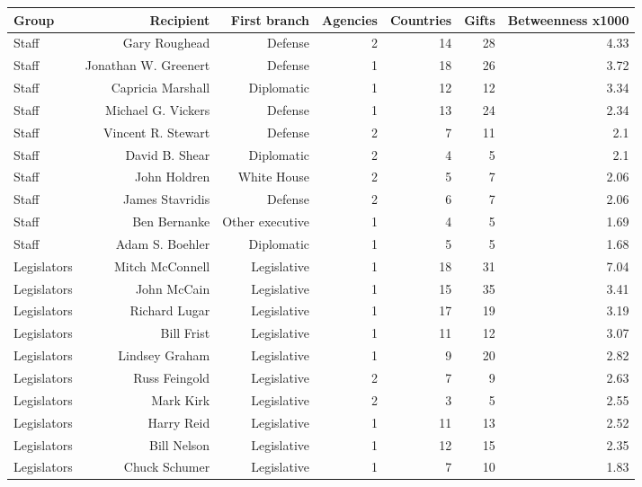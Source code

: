 \begin{tabular}{lrrrrrr}
\toprule
Group & Recipient & First branch & Agencies & Countries & Gifts & Betweenness x1000 \\
\midrule
Staff & Gary Roughead & Defense & 2 & 14 & 28 & 4.33 \\
Staff & Jonathan W. Greenert & Defense & 1 & 18 & 26 & 3.72 \\
Staff & Capricia Marshall & Diplomatic & 1 & 12 & 12 & 3.34 \\
Staff & Michael G. Vickers & Defense & 1 & 13 & 24 & 2.34 \\
Staff & Vincent R. Stewart & Defense & 2 & 7 & 11 & 2.1 \\
Staff & David B. Shear & Diplomatic & 2 & 4 & 5 & 2.1 \\
Staff & John Holdren & White House & 2 & 5 & 7 & 2.06 \\
Staff & James Stavridis & Defense & 2 & 6 & 7 & 2.06 \\
Staff & Ben Bernanke & Other executive & 1 & 4 & 5 & 1.69 \\
Staff & Adam S. Boehler & Diplomatic & 1 & 5 & 5 & 1.68 \\
Legislators & Mitch McConnell & Legislative & 1 & 18 & 31 & 7.04 \\
Legislators & John McCain & Legislative & 1 & 15 & 35 & 3.41 \\
Legislators & Richard Lugar & Legislative & 1 & 17 & 19 & 3.19 \\
Legislators & Bill Frist & Legislative & 1 & 11 & 12 & 3.07 \\
Legislators & Lindsey Graham & Legislative & 1 & 9 & 20 & 2.82 \\
Legislators & Russ Feingold & Legislative & 2 & 7 & 9 & 2.63 \\
Legislators & Mark Kirk & Legislative & 2 & 3 & 5 & 2.55 \\
Legislators & Harry Reid & Legislative & 1 & 11 & 13 & 2.52 \\
Legislators & Bill Nelson & Legislative & 1 & 12 & 15 & 2.35 \\
Legislators & Chuck Schumer & Legislative & 1 & 7 & 10 & 1.83 \\
\bottomrule
\end{tabular}
\par{}
